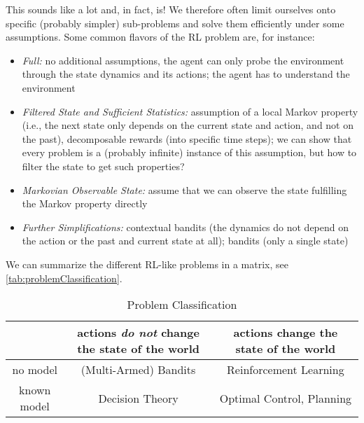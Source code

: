 		This sounds like a lot and, in fact, is! We therefore often limit ourselves onto specific (probably simpler) sub-problems and solve them efficiently under some assumptions. Some common flavors of the \ac{RL} problem are, for instance:
		\begin{itemize}
			\item \emph{Full:} no additional assumptions, the agent can only probe the environment through the state dynamics and its actions; the agent has to understand the environment
			\item \emph{Filtered State and Sufficient Statistics:} assumption of a local Markov property (i.e., the next state only depends on the current state and action, and not on the past), decomposable rewards (into specific time steps); we can show that every problem is a (probably infinite) instance of this assumption, but how to filter the state to get such properties?
			\item \emph{Markovian Observable State:} assume that we can observe the state fulfilling the Markov property directly
			\item \emph{Further Simplifications:} contextual bandits (the dynamics do not depend on the action or the past and current state at all); bandits (only a single state)
		\end{itemize}
		We can summarize the different \ac{RL}-like problems in a matrix, see \autoref{tab:problemClassification}.

		\begin{table}
			\centering
			\begin{tabular}{c||cc}
				\toprule
				            & actions \emph{do not} change the state of the world & actions change the state of the world \\ \midrule
				no model    & (Multi-Armed) Bandits                               & Reinforcement Learning                \\
				known model & Decision Theory                                     & Optimal Control, Planning             \\ \bottomrule
			\end{tabular}
			\caption{Problem Classification}
			\label{tab:problemClassification}
		\end{table}


